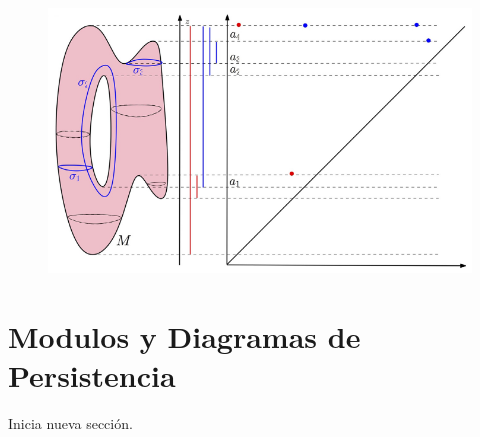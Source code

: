 \begin{figure}[ht]
    \centering
    \includegraphics[width=0.85\linewidth]{./figures/Figura10.png}
    \label{fig:Figura 11}
    \vspace{15pt}
\end{figure}

\newpage

\section{Modulos y Diagramas de Persistencia}

Inicia nueva secci\'on.